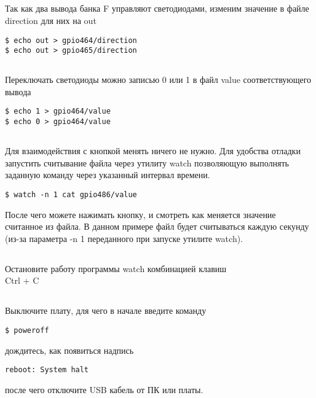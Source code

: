 \subsection{}Так как два вывода банка F управляют светодиодами, изменим значение в файле direction  для них на out
\begin{lstlisting}[style=bash]
$ echo out > gpio464/direction
$ echo out > gpio465/direction
\end{lstlisting}

\subsection{}Переключать светодиоды можно записью 0 или 1 в файл value соответствующего вывода
\begin{lstlisting}[style=bash]
$ echo 1 > gpio464/value
$ echo 0 > gpio464/value
\end{lstlisting}

\subsection{}Для взаимодействия с кнопкой менять ничего не нужно. Для удобства отладки запустить считывание файла через утилиту watch позволяющую выполнять заданную команду через указанный интервал времени.

\begin{lstlisting}[style=bash]
$ watch -n 1 cat gpio486/value
\end{lstlisting}

После чего можете нажимать кнопку, и смотреть как меняется значение считанное из файла. В данном примере файл будет считываться каждую секунду (из-за параметра -n 1 переданного при запуске утилите watch).  

\subsection{}Остановите работу программы watch комбинацией клавиш \\ Ctrl + C

\subsection{} Выключите плату, для чего в начале введите команду
\begin{lstlisting}[style=bash]
	$ poweroff
\end{lstlisting}
дождитесь, как появиться надпись
\begin{lstlisting}[style=stdout]
	reboot: System halt
\end{lstlisting}
после чего отключите USB кабель от ПК или платы. 

